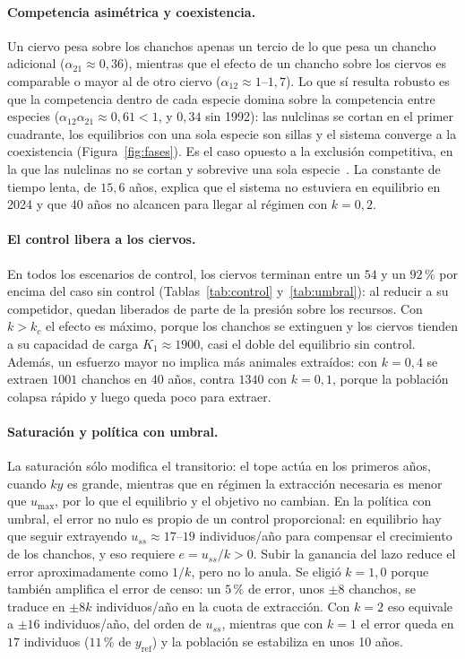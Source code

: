 \documentclass[11pt,a4paper]{article}
\begin{document}
\paragraph{Competencia asimétrica y coexistencia.}
Un ciervo pesa sobre los chanchos apenas un tercio de lo que pesa un chancho
adicional ($\alpha_{21}\approx0{,}36$), mientras que el efecto de un chancho
sobre los ciervos es comparable o mayor al de otro ciervo
($\alpha_{12}\approx1$--$1{,}7$). Lo que sí resulta robusto es que la
competencia dentro de cada especie domina sobre la competencia entre especies
($\alpha_{12}\alpha_{21}\approx0{,}61<1$, y $0{,}34$ sin 1992): las nulclinas
se cortan en el primer cuadrante, los equilibrios con una sola especie son
sillas y el sistema converge a la coexistencia (Figura~\ref{fig:fases}). Es
el caso opuesto a la exclusión competitiva, en la que las nulclinas no se
cortan y sobrevive una sola especie~\cite{murray}. La constante de tiempo
lenta, de $15{,}6$ años, explica que el sistema no estuviera en equilibrio
en 2024 y que 40 años no alcancen para llegar al régimen con $k=0{,}2$.

\paragraph{El control libera a los ciervos.}
En todos los escenarios de control, los ciervos terminan entre un $54$ y un
$92\,\%$ por encima del caso sin control (Tablas~\ref{tab:control}
y~\ref{tab:umbral}): al reducir a su competidor, quedan liberados de parte
de la presión sobre los recursos. Con $k>k_c$ el efecto es máximo, porque los
chanchos se extinguen y los ciervos tienden a su capacidad de carga
$K_1\approx1900$, casi el doble del equilibrio sin control. Además, un
esfuerzo mayor no implica más animales extraídos: con $k=0{,}4$ se extraen
$1001$ chanchos en 40 años, contra $1340$ con $k=0{,}1$, porque la población
colapsa rápido y luego queda poco para extraer.

\paragraph{Saturación y política con umbral.}
La saturación sólo modifica el transitorio: el tope actúa en los primeros
años, cuando $ky$ es grande, mientras que en régimen la extracción necesaria
es menor que $u_{\max}$, por lo que el equilibrio y el objetivo no cambian.
En la política con umbral, el error no nulo es propio de un control
proporcional: en equilibrio hay que seguir extrayendo
$u_{ss}\approx17$--$19$ individuos/año para compensar el crecimiento de los
chanchos, y eso requiere $e=u_{ss}/k>0$. Subir la ganancia del lazo reduce
el error aproximadamente como $1/k$, pero no lo anula. Se eligió $k=1{,}0$
porque también amplifica el error de censo: un $5\,\%$ de error, unos
$\pm8$ chanchos, se traduce en $\pm8k$ individuos/año en la cuota de
extracción. Con $k=2$ eso equivale a $\pm16$ individuos/año, del orden de
$u_{ss}$, mientras que con $k=1$ el error queda en $17$ individuos ($11\,\%$
de $y_{\mathrm{ref}}$) y la población se estabiliza en unos 10 años.
\end{document}

